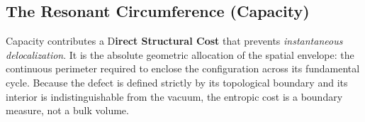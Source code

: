 %
\subsection{The Resonant Circumference (Capacity)}
\label{subsec:alpha_cap}

Capacity contributes a D\textbf{irect Structural Cost} that prevents \emph{instantaneous delocalization}. It is the absolute geometric allocation of the spatial envelope: the continuous perimeter required to enclose the configuration across its fundamental cycle. Because the defect is defined strictly by its topological boundary and its interior is indistinguishable from the vacuum, the entropic cost is a boundary measure, not a bulk volume.

